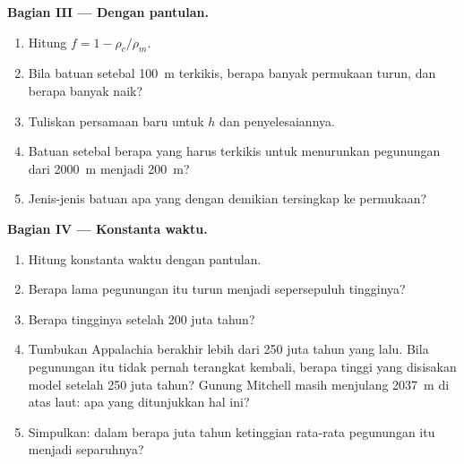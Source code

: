 \begin{problem}
\medskip
\noindent\textbf{Bagian III --- Dengan pantulan.}
\begin{enumerate}[resume]
  \item Hitung $f = 1 - \rho_c/\rho_m$.
  \item Bila batuan setebal \qty{100}{m} terkikis, berapa banyak permukaan
        turun, dan berapa banyak  naik?
  \item Tuliskan persamaan baru untuk $h$ dan penyelesaiannya.
  \item Batuan setebal berapa yang harus terkikis untuk menurunkan pegunungan
        dari \qty{2000}{m} menjadi \qty{200}{m}?
  \item Jenis-jenis batuan apa yang dengan demikian tersingkap ke permukaan?
\end{enumerate}

\medskip
\noindent\textbf{Bagian IV --- Konstanta waktu.}
\begin{enumerate}[resume]
  \item Hitung konstanta waktu dengan pantulan.
  \item Berapa lama pegunungan itu turun menjadi sepersepuluh tingginya?
  \item Berapa tingginya setelah 200 juta tahun?
  \item Tumbukan Appalachia berakhir lebih dari 250 juta tahun yang lalu.
        Bila pegunungan itu tidak pernah terangkat kembali, berapa tinggi yang
        disisakan model setelah 250 juta tahun? Gunung Mitchell masih
        menjulang \qty{2037}{m} di atas laut: apa yang ditunjukkan hal ini?
  \item Simpulkan: dalam berapa juta tahun ketinggian rata-rata pegunungan itu
        menjadi separuhnya?
\end{enumerate}
\end{problem}

